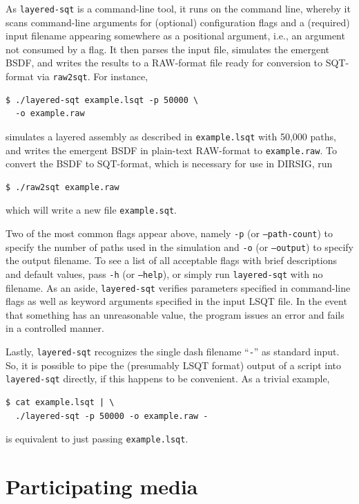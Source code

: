 \documentclass[
    twoside,
    twocolumn,
    letterpaper,
    10pt]{article}
\begin{document}
As \texttt{layered-sqt} is a command-line tool, it runs
on the command line, whereby it scans command-line arguments for
(optional) configuration flags and a (required) input filename
appearing somewhere as a positional argument, i.e., an argument 
not consumed by a flag. It then parses the input file, simulates 
the emergent BSDF,
and writes the results to a RAW-format file ready for conversion to
SQT-format via \texttt{raw2sqt}. For instance, 
\begin{verbatim}
$ ./layered-sqt example.lsqt -p 50000 \
  -o example.raw
\end{verbatim}
simulates a layered assembly as described in \texttt{example.lsqt} 
with 50,000 paths, and writes the emergent BSDF in plain-text RAW-format to
\texttt{example.raw}. To convert the BSDF to SQT-format, which is necessary
for use in DIRSIG, run
\begin{verbatim}
$ ./raw2sqt example.raw
\end{verbatim}
which will write a new file \texttt{example.sqt}.

Two of the most common flags appear above, namely
\texttt{-p} (or \texttt{--path-count}) to specify the number of paths used in
the simulation and \texttt{-o} (or \texttt{--output}) to specify the output 
filename. To see a list of all acceptable flags with brief descriptions and 
default values, pass \texttt{-h} (or \texttt{--help}), or simply run 
\texttt{layered-sqt} with no filename. As an aside,
\texttt{layered-sqt} verifies parameters specified in command-line flags
as well as keyword arguments specified in the input LSQT file.
In the event that something has an unreasonable value, the program
issues an error and fails in a controlled manner.

Lastly, \texttt{layered-sqt} recognizes the single dash filename 
``\texttt{-}'' as standard input. So, it is possible to pipe the 
(presumably LSQT format) output of a script into \texttt{layered-sqt} 
directly, if this happens to be convenient. As a trivial example,
\begin{verbatim}
$ cat example.lsqt | \
  ./layered-sqt -p 50000 -o example.raw -
\end{verbatim}
is equivalent to just passing \texttt{example.lsqt}.

\section{Participating media}
\end{document}
